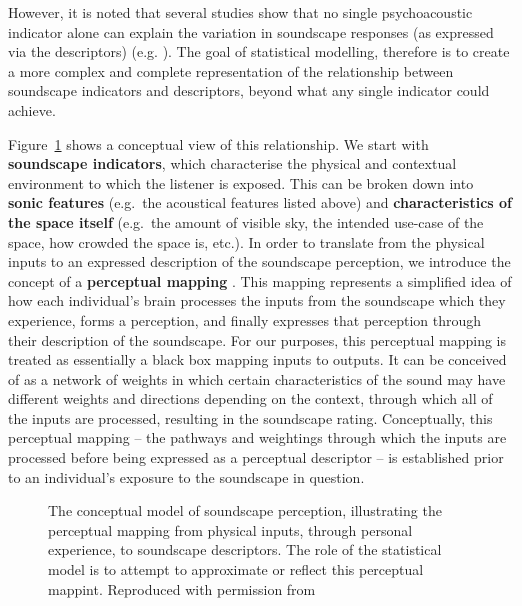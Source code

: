 \documentclass[
  authoryear,
  preprint,
  1p]{elsarticle}
\begin{document}
However, it is noted that several studies show that no single
psychoacoustic indicator alone can explain the variation in soundscape
responses (as expressed via the descriptors) (e.g.
\citep{PerssonWaye2002Psycho}). The goal of statistical modelling,
therefore is to create a more complex and complete representation of the
relationship between soundscape indicators and descriptors, beyond what
any single indicator could achieve.

Figure~\ref{fig-model} shows a conceptual view of this relationship. We
start with \textbf{soundscape indicators}, which characterise the
physical and contextual environment to which the listener is exposed.
This can be broken down into \textbf{sonic features} (e.g.~the
acoustical features listed above) and \textbf{characteristics of the
space itself} (e.g.~the amount of visible sky, the intended use-case of
the space, how crowded the space is, etc.). In order to translate from
the physical inputs to an expressed description of the soundscape
perception, we introduce the concept of a \textbf{perceptual mapping}
\citep{Lionello2021new}. This mapping represents a simplified idea of
how each individual's brain processes the inputs from the soundscape
which they experience, forms a perception, and finally expresses that
perception through their description of the soundscape. For our
purposes, this perceptual mapping is treated as essentially a black box
mapping inputs to outputs. It can be conceived of as a network of
weights in which certain characteristics of the sound may have different
weights and directions depending on the context, through which all of
the inputs are processed, resulting in the soundscape rating.
Conceptually, this perceptual mapping -- the pathways and weightings
through which the inputs are processed before being expressed as a
perceptual descriptor -- is established prior to an individual's
exposure to the soundscape in question.

\begin{figure}


\caption{\label{fig-model}The conceptual model of soundscape perception,
illustrating the perceptual mapping from physical inputs, through
personal experience, to soundscape descriptors. The role of the
statistical model is to attempt to approximate or reflect this
perceptual mappint. Reproduced with permission from
\citet{Mitchell2022Predictive}}

\end{figure}%
\end{document}
